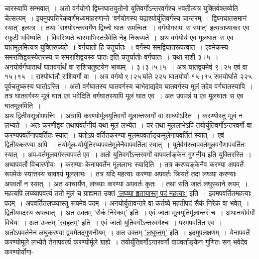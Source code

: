 \documentclass[11pt, openany]{book}
\begin{document}
\newpage

\begin{sloppypar}
\noindent चारस्यापि सम्भवात्~। अतो वर्गयोगो द्विघ्नघातयुतोनो युतिवर्गोऽन्तरवर्गश्च भवतीत्यत्र युक्तिर्वक्तव्येति चेत्सत्यम्~। इयमुपपत्तिरेकवर्णमध्यमाहरणान्ते {\color{violet}'वर्गयोगस्य यद्राश्योर्युतिवर्गस्य चान्तरम्~। द्विघ्नघातसमानं स्यात्'} इत्यत्र~। तथा {\color{violet}'राश्योरन्तरवर्गेण द्विघ्नो घातः समन्वितः~। वर्गयोगसमः स स्यात्'} इत्यत्राप्याकर एव स्फुटी भविष्यति~। विवरिष्यते चास्माभिस्तत्रैवेति नेह निरूप्यते~। अथ वर्गयोर्य एव मूलघातः स एव घातमूलमित्यत्र युक्तिरुच्यते~। वर्गघातो हि चतुर्घातः~। वर्गस्य समद्विघातरूपत्वात्~। एवमेकस्य समराशिद्वयस्येतरस्य च समराशिद्वयस्य घातः इति चतुर्घातोः वर्गघातः~। यथा राशी ३।५~। अनयोर्वर्गघातार्थं घातवर्गार्थं वा राशिचतुष्टयेन भाव्यम्~। ३।३।५।५~। अत्र घातद्वयमेवं ९।२५ एवं वा १५।१५~। राश्योर्घातौ राशिवर्गौ वा~। अत्र वर्गयो\textendash \,९।२५\textendash \,र्घाते २२५ घातयोर्वा १५।१५ समयोर्घाते २२५ पूर्वचतुष्कस्य घातोऽस्ति~। अतो वर्गघातस्य घातवर्गस्य चाभेदाद्यदेव घातवर्गस्य मूलं तदेव वर्गघातस्यापि~। तत्र घातवर्गस्य मूलं घात एव भवेदिति वर्गघातस्यापि मूलं घात एव~। अत उपपन्नं य एव मूलघातः स एव घातमूलमिति~।\\

अथ द्वितीयसूत्रोपपत्तिः~। अत्रापि करण्योर्मूलयुतिवर्गो मूलान्तरवर्गो वा साध्योऽस्ति~। करण्योस्तु मूलं न लभ्यते~। अतः करणीद्वयं तथापवर्तनीयं यथा मूलं लभ्येत~। परं तथा मूललाभेऽपि तयोर्युतिवर्गोऽन्तरवर्गो वा करण्यपवर्तेनापवर्तितः स्यात्~। यतोऽप-वर्तितकरण्या मूलमपवर्ताङ्कमूलेनापवर्तितं स्यात्~। एवं द्वितीयकरण्या अपि~। तयोर्मूल-योर्युतिरप्यपवर्तमूलेनैवापवर्तिता स्यात्~। युतेर्वर्गस्त्वपवर्तमूलवर्गेणापवर्तितः स्यात्~। अप-वर्तमूलवर्गस्त्वपवर्त एव~। अतो युतिवर्गोऽन्तरवर्गो वापवर्ताङ्केन गुणनीय इति युक्तिरस्ति~। अथापवर्तो विचारणीयः~। करण्याः केनापवर्तेन मूललाभः स्यादिति~। तत्र करण्यङ्केनैव करण्या अपवर्ते रूपमेकं स्यात्तस्य चावश्यं मूललाभः~। तत्र यदि महत्याः करण्या अपवर्तः क्रियते तदा लघ्व्या करण्याः अपवर्तो न स्यात्~। अत आचार्येण, लघ्व्याः करण्या अपवर्तः कृतः~। तथा सति जातं लघुस्थाने रूपम्~। महत्यपि लघ्व्यापवर्त्य ततो मूलं च ग्राह्यमत उक्तं \hyperref[4.34]{'लघ्व्या हृतायास्तु पदं महत्याः'} इति~। इदमपवर्तितमहत्याः पदम्~। अपवर्तितलघ्व्यास्तु रूपमेव पदम्~। अनयोर्युतावन्तरे वा कर्तव्ये महतीपदं सैकं निरेकं वा भवेत्~। द्वितीयपदस्य रूपत्वात्~। अत उक्तम् \hyperref[4.34]{'सैकं निरेकम्'} इति~। एवं जाता मूलयुतिर्मूलान्तरं च~। अथानयोर्वर्गो विधेयः~। अत उक्तम् \hyperref[4.34]{'स्वहतम्'} इति~। एवं जातो युतिवर्गोऽन्तरवर्गश्च~। परमपवर्तित एव~। अतोऽपवर्तनेन लघुकरण्या द्वयमेतद्गुणनीयम्~। अत उक्तम् \hyperref[4.34]{'लघुघ्नम्'} इति~। इदमुपलक्षणम्~। येनापवर्ते करण्योमूले लभ्येते तेनापवर्त्य करण्योर्मूले ग्राह्ये~। तयोर्युतिवर्गोऽन्तरवर्गो वापवर्ताङ्केन गुणितः सन् भवेदेव करण्योर्योगा-
\end{sloppypar}
\end{document}
